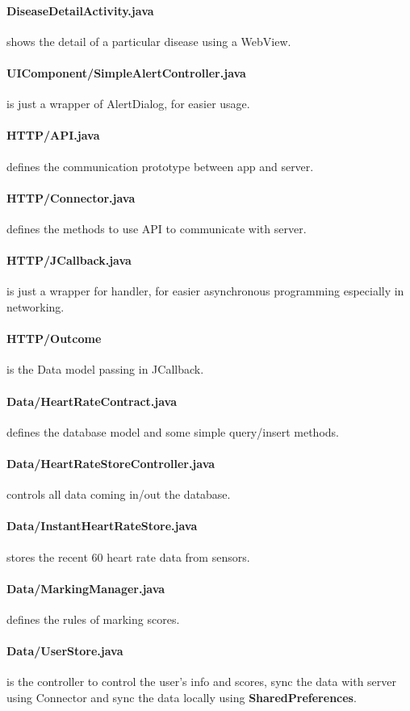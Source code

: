 \documentclass[10pt,a4paper,final]{scrartcl}
\begin{document}
\paragraph{DiseaseDetailActivity.java} shows the detail of a particular disease using a WebView.
\paragraph{UIComponent/SimpleAlertController.java} is just a wrapper of AlertDialog, for easier usage.
\paragraph{HTTP/API.java} defines the communication prototype between app and server.
\paragraph{HTTP/Connector.java} defines the methods to use API to communicate with server.
\paragraph{HTTP/JCallback.java} is just a wrapper for handler, for easier asynchronous programming especially in networking.
\paragraph{HTTP/Outcome} is the Data model passing in JCallback.
\paragraph{Data/HeartRateContract.java} defines the database model and some simple query/insert methods.
\paragraph{Data/HeartRateStoreController.java} controls all data coming in/out the database.
\paragraph{Data/InstantHeartRateStore.java} stores the recent 60 heart rate data from sensors.
\paragraph{Data/MarkingManager.java} defines the rules of marking scores.
\paragraph{Data/UserStore.java} is the controller to control the user's info and scores, sync the data with server using Connector and sync the data locally using {\bf SharedPreferences}.
\end{document}
